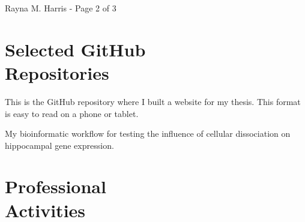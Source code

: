 \documentclass[margin,line]{CV}
\begin{document}
\begin{resume}
\vspace{0.35 cm}
{\centerline {Rayna M. Harris - Page 2 of 3}}
\newpage



\section{\mysidestyle Selected GitHub \\Repositories}

\begin{description}
\setlength{\itemsep}{3pt}

\item [\href{https://github.com/raynamharris/Thesis}{Thesis}] This is the GitHub repository where I built a website for my thesis. This format is easy to read on a phone or tablet.

\item [\href{https://github.com/raynamharris/DissociationTest}{DissociationTest}] My bioinformatic workflow for testing the influence of cellular dissociation on hippocampal gene expression.



\end{description}


    
\section{\mysidestyle Professional\\Activities}


\end{resume}
\end{document}
